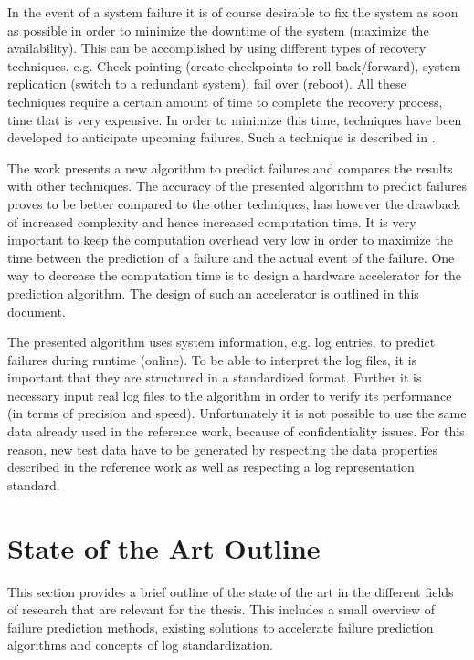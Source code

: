 \documentclass[12pt]{article} %
\begin{document}
In the event of a system failure it is of course desirable to fix the system as
soon as possible in order to minimize the downtime of the system (maximize the
availability). This can be accomplished by using different types of recovery
techniques, e.g. Check-pointing (create checkpoints to roll back/forward),
system replication (switch to a redundant system), fail over (reboot). All these
techniques require a certain amount of time to complete the recovery process,
time that is very expensive. In order to minimize this time, techniques have
been developed to anticipate upcoming failures. Such a technique is described in
\cite{salfner08}.

The work presents a new algorithm to predict failures and compares the results
with other techniques. The accuracy of the presented algorithm to predict
failures proves to be better compared to the other techniques, has however the
drawback of increased complexity and hence increased computation time. It is
very important to keep the computation overhead very low in order to maximize
the time between the prediction of a failure and the actual event of the
failure. One way to decrease the computation time is to design a hardware
accelerator for the prediction algorithm. The design of such an accelerator is
outlined in this document.

The presented algorithm uses system information, e.g. log entries, to predict
failures during runtime (online). To be able to interpret the log files, it is
important that they are structured in a standardized format. Further it is
necessary input real log files to the algorithm in order to verify its
performance (in terms of precision and speed). Unfortunately it is not possible
to use the same data already used in the reference work, because of
confidentiality issues. For this reason, new test data have to be generated by
respecting the data properties described in the reference work as well as
respecting a log representation standard.


\section{State of the Art Outline} %

This section provides a brief outline of the state of the art in the different
fields of research that are relevant for the thesis. This includes a small
overview of failure prediction methods, existing solutions to accelerate
failure prediction algorithms and concepts of log standardization.
\end{document}
